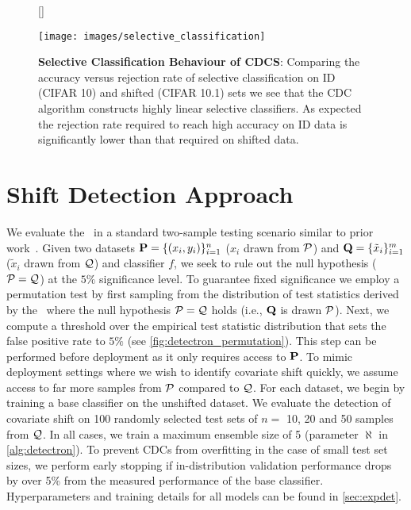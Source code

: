 \begin{figure}[!htb]
    [\FBwidth]
    {\caption{\small \textbf{Selective Classification Behaviour of CDCS}: Comparing the accuracy versus rejection rate of selective classification on ID (CIFAR 10) and shifted (CIFAR 10.1)
        sets we see that the CDC algorithm constructs highly linear selective classifiers. As expected the rejection rate required to reach high accuracy on ID data is significantly lower
        than that required on shifted data.}
    \label{fig:selective_cls}}
    {\texttt{[image: images/selective\_classification]}}
\end{figure}


\section{Shift Detection Approach} We evaluate the \method\ in a standard two-sample testing scenario similar to prior work~\citep{zhao2022comparing}.
Given two datasets $\mathbf{P} = \{(x_i,y_i)\}_{i=1}^n$ ($x_i$ drawn from $\mathcal{P}$) and $\mathbf{Q} = \{\tilde{x}_i\}_{i=1}^m$ ($\tilde{x}_i$ drawn from $\mathcal{Q}$) and classifier $f$,
we seek to rule out the null hypothesis ($\mathcal{P} = \mathcal{Q}$) at the $5\%$ significance level.
To guarantee fixed significance we employ a permutation test by first sampling from the distribution of test statistics
derived by the \method\ where the null hypothesis $\mathcal{P}=\mathcal{Q}$ holds (i.e., $\mathbf{Q}$ is drawn $\mathcal{P}$).
Next, we compute a threshold over the empirical test statistic distribution that sets the false positive rate to $5\%$ (see \autoref{fig:detectron_permutation}).
This step can be performed before deployment as it only requires access to $\mathbf{P}$.
To mimic deployment settings where we wish to identify covariate shift quickly,
we assume access to far more samples from $\mathcal{P}$ compared to $\mathcal{Q}$.
For each dataset, we begin by training a base classifier on the unshifted dataset.
We evaluate the detection of covariate shift on 100 randomly selected test sets of $n=$ 10, 20 and 50 samples from $\mathcal{Q}$.
In all cases, we train a maximum ensemble size of 5 (parameter $\aleph$ in \autoref{alg:detectron}).
To prevent CDCs from overfitting in the case of small test set sizes, we perform early stopping if in-distribution validation performance drops by over 5\% from the measured performance of the base classifier.
Hyperparameters and training details for all models can be found in \autoref{sec:expdet}.

